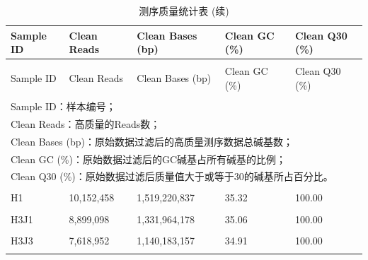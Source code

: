 \documentclass[
  a4paper,
  titlepage]{article}
\begin{document}
\begin{longtable}[t]{lllll}
\caption{\label{tab:cleanstat-table}测序质量统计表}\\
\toprule
Sample ID & Clean Reads & Clean Bases (bp) & Clean GC (\%) & Clean Q30 (\%)\\
\midrule
\endfirsthead
\caption[]{\label{tab:cleanstat-table}测序质量统计表 (续)}\\
\toprule
Sample ID & Clean Reads & Clean Bases (bp) & Clean GC (\%) & Clean Q30 (\%)\\
\midrule
\endhead
\hline
\endfoot
\bottomrule
\multicolumn{5}{l}{\rule{0pt}{1em}\textit{注：}}\\
\multicolumn{5}{l}{\rule{0pt}{1em}Sample ID：样本编号；}\\
\multicolumn{5}{l}{\rule{0pt}{1em}Clean Reads：高质量的Reads数；}\\
\multicolumn{5}{l}{\rule{0pt}{1em}Clean Bases (bp)：原始数据过滤后的高质量测序数据总碱基数；}\\
\multicolumn{5}{l}{\rule{0pt}{1em}Clean GC (\%)：原始数据过滤后的GC碱基占所有碱基的比例；}\\
\multicolumn{5}{l}{\rule{0pt}{1em}Clean Q30 (\%)：原始数据过滤后质量值大于或等于30的碱基所占百分比。}\\
\endlastfoot
\cellcolor{gray!6}{FJMS} & \cellcolor{gray!6}{45,140,754} & \cellcolor{gray!6}{6,755,813,140} & \cellcolor{gray!6}{34.60} & \cellcolor{gray!6}{100.00}\\
 
H1 & 10,152,458 & 1,519,220,837 & 35.32 & 100.00\\
 
\cellcolor{gray!6}{H3} & \cellcolor{gray!6}{6,396,978} & \cellcolor{gray!6}{957,446,321} & \cellcolor{gray!6}{34.50} & \cellcolor{gray!6}{100.00}\\
 
H3J1 & 8,899,098 & 1,331,964,178 & 35.06 & 100.00\\
 
\cellcolor{gray!6}{H3J2} & \cellcolor{gray!6}{9,304,530} & \cellcolor{gray!6}{1,392,643,281} & \cellcolor{gray!6}{35.10} & \cellcolor{gray!6}{100.00}\\
 
H3J3 & 7,618,952 & 1,140,183,157 & 34.91 & 100.00\\
 
\cellcolor{gray!6}{H3J4} & \cellcolor{gray!6}{8,920,620} & \cellcolor{gray!6}{1,335,092,618} & \cellcolor{gray!6}{35.94} & \cellcolor{gray!6}{100.00}\\
 

\end{longtable}
\end{document}
